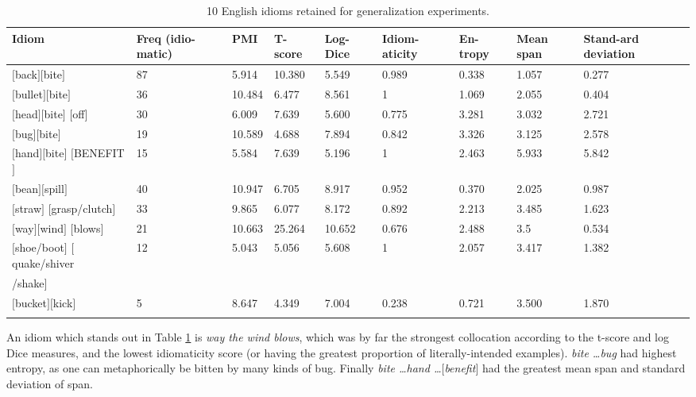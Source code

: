 \documentclass[output=paper]{langsci/langscibook}
\begin{document}
\begin{table}[H]
\small
\begin{tabular}{p{1.7cm} p{0.8cm}p{0.7cm}p{0.8cm}p{0.85cm}p{0.85cm}p{0.85cm}p{0.85cm}p{0.9cm}}
\lsptoprule
Idiom & Freq (idio-matic) & PMI & T-score & Log-Dice & Idiom-aticity & En-tropy &
Mean span & Stand-ard deviation\\%
\midrule
$[$back$]$$[$bite$]$ &
87 &
5.914 &
10.380 &
5.549 &
0.989 &
0.338 &
1.057 &
0.277\\%
$[$bullet$]$$[$bite$]$ &
36 &
10.484 &
6.477 &
8.561 &
1 &
1.069 &
2.055 &
0.404\\%
$[$head$]$$[$bite$]$ $[$off$]$ &
30 &
6.009 &
7.639 &
5.600 &
0.775 &
3.281 &
3.032 &
2.721\\%
$[$bug$]$$[$bite$]$ &
19 &
10.589 &
4.688 &
7.894 &
0.842 &
3.326 &
3.125 &
2.578\\%
$[$hand$]$$[$bite$]$ $[$BENEFIT$]$ &
15 &
5.584 &
7.639 &
5.196 &
1 &
2.463 &
5.933 &
5.842\\%
$[$bean$]$$[$spill$]$ &
40 &
10.947 &
6.705 &
8.917 &
0.952 &
0.370 &
2.025 &
0.987\\%
$[$straw$]$ $[$grasp/clutch$]$ &
33 &
9.865 &
6.077 &
8.172 &
0.892 &
2.213 &
3.485 &
1.623\\%
$[$way$]$$[$wind$]$ $[$blows$]$ &
21 &
10.663 &
25.264 &
10.652 &
0.676 &
2.488 &
3.5 &
0.534\\%
$[$shoe/boot$]$ $[$quake/shiver  &
12 &
5.043 &
5.056 &
5.608 &
1 &
2.057 &
3.417 &
1.382\\%
/shake$]$ & & & & & & & & \\
$[$bucket$]$$[$kick$]$ &
5 &
8.647 &
4.349 &
7.004 &
0.238 &
0.721 &
3.500 &
1.870\\%
\lspbottomrule
\end{tabular}
\caption{10 English idioms retained for generalization experiments.}
\label{10 English idioms}
\end{table}


An idiom which stands out in Table \ref{10 English idioms} is \textit{way the wind blows}, which was
by far the strongest collocation according to the t-score and log Dice
measures, and the lowest idiomaticity score (or having the greatest
proportion of literally-intended examples). \textit{bite \ldots bug} had highest
entropy, as one can metaphorically be bitten by many kinds of bug.
Finally \textit{bite \ldots hand \ldots $[$benefit$]$} had the greatest mean span and
standard deviation of span. 
\end{document}
